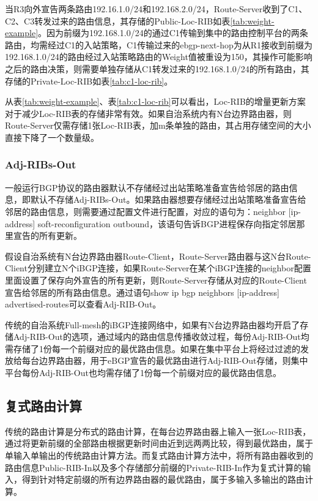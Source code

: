 当R3向外宣告两条路由192.16.1.0/24和192.168.2.0/24，Route-Server收到了C1、C2、C3转发过来的路由信息，其存储的Public-Loc-RIB如表\ref{tab:weight-example}。因为前缀为192.168.1.0/24的通过C1传输到集中的路由控制平台的两条路由，均需经过C1的入站策略，C1传输过来的ebgp-next-hop为从R1接收到前缀为192.168.1.0/24的路由经过入站策略路由的Weight值被重设为150，其操作可能影响之后的路由决策，则需要单独存储从C1转发过来的192.168.1.0/24的所有路由，其存储的Private-Loc-RIB如表\ref{tab:c1-loc-rib}。


从表\ref{tab:weight-example}、表\ref{tab:c1-loc-rib}可以看出，Loc-RIB的增量更新方案对于减少Loc-RIB表的存储非常有效。如果自治系统内有N台边界路由器，则Route-Server仅需存储1张Loc-RIB表，加m条单独的路由，其占用存储空间的大小直接下降了一个数量级。


\subsubsection{Adj-RIBs-Out}
一般运行BGP协议的路由器默认不存储经过出站策略准备宣告给邻居的路由信息，即默认不存储Adj-RIBs-Out。如果路由器想要存储经过出站策略准备宣告给邻居的路由信息，则需要通过配置文件进行配置，对应的语句为：neighbor [ip-address] soft-reconfiguration outbound，该语句告诉BGP进程保存向指定邻居那里宣告的所有更新。


假设自治系统有N台边界路由器Route-Client，Route-Server路由器与这N台Route-Client分别建立N个iBGP连接，如果Route-Server在某个iBGP连接的neighbor配置里面设置了保存向外宣告的所有更新，则Route-Server存储从对应的Route-Client宣告给邻居的所有路由信息。通过语句show ip bgp neighbors [ip-address] advertised-routes可以查看Adj-RIB-Out。

传统的自治系统Full-mesh的iBGP连接网络中，如果有N台边界路由器均开启了存储Adj-RIB-Out的选项，通过域内的路由信息传播收敛过程，每份Adj-RIB-Out均需存储了1份每一个前缀对应的最优路由信息。如果在集中平台上将经过过滤的发放给每台边界路由器，用于eBGP宣告的最优路由进行Adj-RIB-Out存储，则集中平台每份Adj-RIB-Out也均需存储了1份每一个前缀对应的最优路由信息。

\subsection{复式路由计算}


传统的路由计算是分布式的路由计算，在每台边界路由器上输入一张Loc-RIB表，通过将更新前缀的全部路由根据更新时间由近到远两两比较，得到最优路由，属于单输入单输出的传统路由计算方法。而复式路由计算方法中，将所有路由器收到的路由信息Public-RIB-In以及多个存储部分前缀的Private-RIB-In作为复式计算的输入，得到针对特定前缀的所有边界路由器的最优路由，属于多输入多输出的路由计算。

